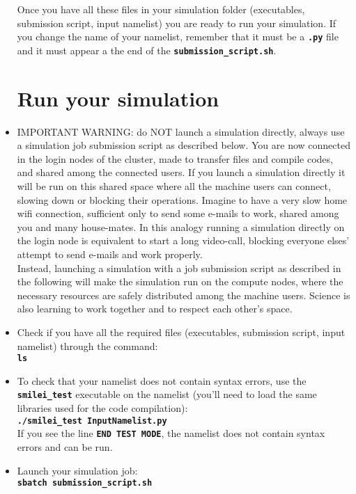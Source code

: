 \documentclass{article}
\newcommand{\commandline}[1]{\texttt{\textbf{#1}}}
\begin{document}
\begin{itemize}
Once you have all these files in your simulation folder (executables, submission script, input namelist) you are ready to run your simulation. If you change the name of your namelist,  remember that it must be a \commandline{.py} file and it must appear a the end of the \commandline{submission\_script.sh}.

\section{Run your simulation}
\item IMPORTANT WARNING: do NOT launch a simulation directly,  always use a simulation job submission script as described below. You are now connected in the login nodes of the cluster,  made to transfer files and compile codes, and shared among the connected users.  If you launch a simulation directly it will be run on this shared space where all the machine users can connect, slowing down or blocking their operations.  Imagine to have a very slow home wifi connection, sufficient only to send some e-mails to work, shared among you and many house-mates.  In this analogy running a simulation directly on the login node is equivalent to start a long video-call, blocking everyone elses' attempt to send e-mails and work properly. \\

Instead, launching a simulation with a job submission script as described in the following will make the simulation run on the compute nodes, where the necessary resources are safely distributed among the machine users.  Science is also learning to work together and to respect each other's space.\\

\item Check if you have all the required files (executables, submission script, input namelist) through the command:\\
\commandline{ls}

\item To check that your namelist does not contain syntax errors, use the \commandline{smilei\_test} executable on the namelist (you'll need to load the same libraries used for the code compilation):\\
\commandline{./smilei\_test InputNamelist.py}\\
If you see the line \commandline{END TEST MODE}, the namelist does not contain syntax errors and can be run.

\item Launch your simulation job:\\
\commandline{sbatch submission\_script.sh}


\end{itemize}
\end{document}
